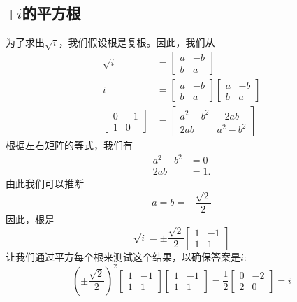 \subsection{\boldmath $\pm i$的平方根}
为了求出$\sqrt{i}$，我们假设根是复根。因此，我们从
$$
  \begin{aligned}
    \sqrt{i}                                    & =\left[\begin{array}{cc}
        a & -b \\
        b & a
      \end{array}\right]                                         \\
    i                                           & =\left[\begin{array}{cc}
        a & -b \\
        b & a
      \end{array}\right]\left[\begin{array}{cc}
        a & -b \\
        b & a
      \end{array}\right] \\
    {\left[\begin{array}{cc}
        0 & -1 \\
        1 & 0
      \end{array}\right] } & =\left[\begin{array}{cc}
        a^{2}-b^{2} & -2 a b      \\
        2 a b       & a^{2}-b^{2}
      \end{array}\right]
  \end{aligned}
$$
根据左右矩阵的等式，我们有
$$
  \begin{aligned}
    a^{2}-b^{2} & =0   \\
    2 a b       & =1 .
  \end{aligned}
$$
由此我们可以推断
$$
  a=b= \pm \frac{\sqrt{2}}{2}
$$
因此，根是
$$
  \sqrt{i}= \pm \frac{\sqrt{2}}{2}\left[\begin{array}{cc}
      1 & -1 \\
      1 & 1
    \end{array}\right]
$$
让我们通过平方每个根来测试这个结果，以确保答案是$i$:
$$
  \left( \pm \frac{\sqrt{2}}{2}\right)^{2}\left[\begin{array}{cc}
      1 & -1 \\
      1 & 1
    \end{array}\right]\left[\begin{array}{cc}
      1 & -1 \\
      1 & 1
    \end{array}\right]=\frac{1}{2}\left[\begin{array}{cc}
      0 & -2 \\
      2 & 0
    \end{array}\right]=i
$$
